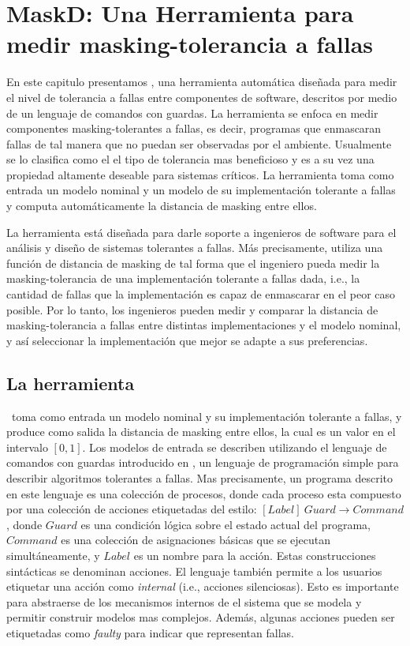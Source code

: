 \chapter{MaskD: Una Herramienta para medir masking-tolerancia a fallas}
\label{cap:maskD}

En este capitulo presentamos {\MaskD}, una herramienta automática diseñada para medir el nivel de tolerancia a fallas entre componentes de software, 
descritos por medio de un lenguaje de comandos con guardas.
La herramienta se enfoca en medir componentes masking-tolerantes a fallas, es decir, programas que enmascaran fallas de tal manera que no puedan ser observadas por el ambiente. Usualmente se lo clasifica como el el tipo de tolerancia mas beneficioso y es a su vez una propiedad altamente deseable para sistemas críticos. 
La herramienta toma como entrada un modelo nominal y un modelo de su implementación tolerante a fallas y computa automáticamente la distancia de masking entre ellos. 

La herramienta está diseñada para darle soporte a ingenieros de software para el análisis y diseño de sistemas tolerantes a fallas. Más precisamente, utiliza una función de distancia de masking de tal forma que el ingeniero pueda medir la masking-tolerancia de una implementación tolerante a fallas dada, i.e., la cantidad de fallas que la implementación es capaz de enmascarar en el peor caso posible. 
Por lo tanto, los ingenieros pueden medir y comparar la distancia de masking-tolerancia a fallas entre distintas implementaciones y el modelo nominal, y así seleccionar la implementación que mejor se adapte a sus preferencias.

\section{La herramienta} \label{sec:mask_sec}

\MaskD~toma como entrada un modelo nominal y su implementación tolerante a fallas, y produce como salida la distancia de masking entre ellos, la cual es un valor en el intervalo $[0,1]$.
Los modelos de entrada se describen utilizando el lenguaje de comandos con guardas introducido en \cite{AroraGouda93}, un lenguaje de programación simple para describir algoritmos tolerantes a fallas.
Mas precisamente, un programa descrito en este lenguaje es una colección de procesos, donde cada proceso esta compuesto por una colección de acciones etiquetadas del estilo: $[Label]~Guard \rightarrow Command$, donde $Guard$ es una condición lógica sobre el estado actual del programa, $Command$ es una colección de asignaciones básicas que se ejecutan simultáneamente, y $Label$ es un nombre para la acción.
Estas construcciones sintácticas se denominan acciones. El lenguaje también permite a los usuarios etiquetar una acción como \emph{internal} (i.e., acciones silenciosas). Esto es importante para abstraerse de los mecanismos internos de el sistema que se modela y permitir construir modelos mas complejos. Además, algunas acciones pueden ser etiquetadas como \emph{faulty} para indicar que representan fallas. 

